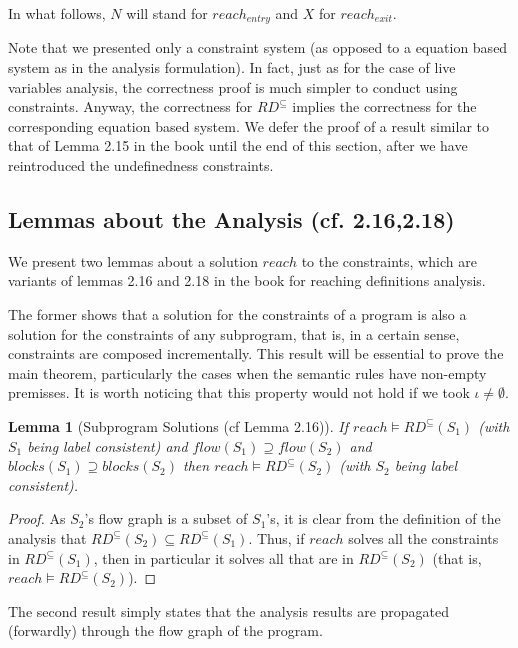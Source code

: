 \documentclass[a4wide,12pt]{article}
\theoremstyle{definition}
\theoremstyle{plain}
\newtheorem{lemma}[theo]{Lemma}
\theoremstyle{remark}
\begin{document}
In what follows, $N$ will stand for $reach_{entry}$ and $X$ for $reach_{exit}$. 


Note that we presented only a constraint system (as opposed to a equation based system 
as in the analysis formulation). In fact, just as for the case of live variables analysis,
the correctness proof is much simpler to conduct using constraints. Anyway,
the correctness for $RD^\subseteq$ implies the correctness for the corresponding
equation based system. We defer the proof of a result similar to that of Lemma 2.15 in the book
until the end of this section, after we have reintroduced the undefinedness constraints.


\subsection*{Lemmas about the Analysis (cf. 2.16,2.18)}

We present two lemmas about a solution $reach$ to the constraints, which are variants
of lemmas 2.16 and 2.18 in the book for reaching definitions analysis.

The former 
shows that a solution for the constraints of a program is also a solution for the constraints of any
subprogram, that is, in a certain sense, constraints are composed incrementally.
This result will be essential to prove the main theorem, particularly the cases when
the semantic rules have non-empty premisses. 
It is worth noticing that this property would not hold if we took $\iota \neq \emptyset$.

\begin{lemma}[Subprogram Solutions (cf Lemma 2.16)]
\label{lemmasubp}
If $reach \models RD^\subseteq(S_1)$ (with $S_1$ being label consistent) and
$flow(S_1) \supseteq flow(S_2)$ and $blocks(S_1) \supseteq blocks(S_2)$ then
$reach \models RD^\subseteq(S_2)$ (with $S_2$ being label consistent).
\end{lemma}
\begin{proof}
As $S_2$'s flow graph is a subset of $S_1$'s, it is clear from the definition
of the analysis 
that $RD^{\subseteq}(S_2) \subseteq RD^{\subseteq}(S_1)$. Thus, if 
$reach$ solves all the constraints in $RD^\subseteq(S_1)$, then in particular it
solves all that are in $RD^\subseteq(S_2)$ (that is, $reach \models RD^\subseteq(S_2)$).
\end{proof}


The second result simply states that the analysis results are
propagated (forwardly) through the flow graph of the program.
\end{document}
